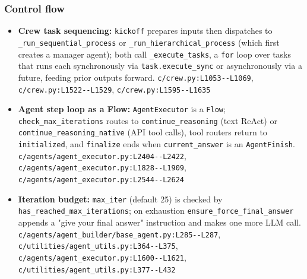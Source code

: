 \subsubsection*{Control flow}
\begin{itemize}
\item \textbf{Crew task sequencing:} \texttt{kickoff} prepares inputs then dispatches to \texttt{\_\allowbreak{}run\_\allowbreak{}sequential\_\allowbreak{}process} or \texttt{\_\allowbreak{}run\_\allowbreak{}hierarchical\_\allowbreak{}process} (which first creates a manager agent); both call \texttt{\_\allowbreak{}execute\_\allowbreak{}tasks}, a \texttt{for} loop over tasks that runs each synchronously via \texttt{task.\allowbreak{}execute\_\allowbreak{}sync} or asynchronously via a future, feeding prior outputs forward. \texttt{c/\allowbreak{}crew.\allowbreak{}py:\allowbreak{}L1053-\allowbreak{}-\allowbreak{}L1069}, \texttt{c/\allowbreak{}crew.\allowbreak{}py:\allowbreak{}L1522-\allowbreak{}-\allowbreak{}L1529}, \texttt{c/\allowbreak{}crew.\allowbreak{}py:\allowbreak{}L1595-\allowbreak{}-\allowbreak{}L1635}
\item \textbf{Agent step loop as a Flow:} \texttt{AgentExecutor} is a \texttt{Flow}; \texttt{check\_\allowbreak{}max\_\allowbreak{}iterations} routes to \texttt{continue\_\allowbreak{}reasoning} (text ReAct) or \texttt{continue\_\allowbreak{}reasoning\_\allowbreak{}native} (API tool calls), tool routers return to \texttt{initialized}, and \texttt{finalize} ends when \texttt{current\_\allowbreak{}answer} is an \texttt{AgentFinish}. \texttt{c/\allowbreak{}agents/\allowbreak{}agent\_\allowbreak{}executor.\allowbreak{}py:\allowbreak{}L2404-\allowbreak{}-\allowbreak{}L2422}, \texttt{c/\allowbreak{}agents/\allowbreak{}agent\_\allowbreak{}executor.\allowbreak{}py:\allowbreak{}L1828-\allowbreak{}-\allowbreak{}L1909}, \texttt{c/\allowbreak{}agents/\allowbreak{}agent\_\allowbreak{}executor.\allowbreak{}py:\allowbreak{}L2544-\allowbreak{}-\allowbreak{}L2624}
\item \textbf{Iteration budget:} \texttt{max\_\allowbreak{}iter} (default 25) is checked by \texttt{has\_\allowbreak{}reached\_\allowbreak{}max\_\allowbreak{}iterations}; on exhaustion \texttt{ensure\_\allowbreak{}force\_\allowbreak{}final\_\allowbreak{}answer} appends a "give your final answer" instruction and makes one more LLM call. \texttt{c/\allowbreak{}agents/\allowbreak{}agent\_\allowbreak{}builder/\allowbreak{}base\_\allowbreak{}agent.\allowbreak{}py:\allowbreak{}L285-\allowbreak{}-\allowbreak{}L287}, \texttt{c/\allowbreak{}utilities/\allowbreak{}agent\_\allowbreak{}utils.\allowbreak{}py:\allowbreak{}L364-\allowbreak{}-\allowbreak{}L375}, \texttt{c/\allowbreak{}agents/\allowbreak{}agent\_\allowbreak{}executor.\allowbreak{}py:\allowbreak{}L1600-\allowbreak{}-\allowbreak{}L1621}, \texttt{c/\allowbreak{}utilities/\allowbreak{}agent\_\allowbreak{}utils.\allowbreak{}py:\allowbreak{}L377-\allowbreak{}-\allowbreak{}L432}

\end{itemize}
